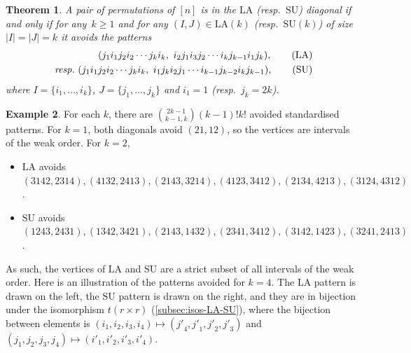 \documentclass{amsart}
\newtheorem{theorem}{Theorem}[section]
\theoremstyle{definition}
\newtheorem{example}[theorem]{Example}
\newcommand{\resp}{\textit{resp.}~} %
\newcommand{\SU}{\mathrm{SU}}
\newcommand{\LA}{\mathrm{LA}}
\begin{document}
\begin{theorem}
\label{prop: LAD Fish Pattern}
A pair of permutations of $[n]$ is in the $\LA$ (\resp $\SU$) diagonal if and only if for any~$k\geq 1$ and for any $(I,J) \in \LA(k)$ (\resp $\SU(k)$) of size $|I|=|J|=k$ it avoids the patterns 
\begin{align}
	(j_1 i_1 j_2 i_2 \cdots j_k i_k,\ i_2 j_1 i_3 j_2 \cdots i_k j_{k-1} i_1 j_k), \tag{LA} \label{eq:pattern} \\
	\text{ \resp } (j_1 i_1 j_2 i_2 \cdots j_k i_k, \ i_1 j_k i_2 j_1 \cdots i_{k-1} j_{k-2}i_k j_{k-1}), \tag{SU}
\end{align}
where $I=\{i_1,\dots,i_k\}$, $J=\{j_1,\dots,j_k\}$ and $i_1=1$ (\resp $j_k=2k$).
\end{theorem}

\begin{example}\label{exm:intervalsWeakOrderNotDiagonals}
For each $k$, there are $\binom{2k-1}{k-1,k}(k-1)!k!$ avoided standardised patterns.
For $k=1$, both diagonals avoid $(21,12)$, so the vertices are intervals of the weak order.
For $k=2$, 
\begin{itemize}
    \item $\LA$ avoids 
    $(3142,2314), (4132,2413),
    (2143,3214), (4123,3412),
    (2134,4213), (3124,4312)$.
    \item $\SU$ avoids 
    $(1243,2431),(1342,3421),
    (2143,1432),(2341,3412),
    (3142,1423),(3241,2413)$.
\end{itemize}
As such, the vertices of $\LA$ and $\SU$ are a strict subset of all intervals of the weak order.
Here is an illustration of the patterns avoided for $k=4$.
The $\LA$ pattern is drawn on the left, the $\SU$ pattern is drawn on the right, and they are in bijection under the isomorphism $t(r\times r)$ (\cref{subsec:isos-LA-SU}), where the bijection between elements is $(i_1,i_2,i_3,i_4)\mapsto ({j'}_4,{j'}_1,{j'}_2,{j'}_3)$ and $(j_1,j_2,j_3,j_4)\mapsto ({i'}_1,{i'}_2,{i'}_3,{i'}_4)$.
\begin{center}
\end{center}
\end{example}
\end{document}
